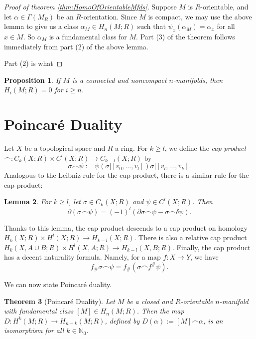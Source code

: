 \documentclass{book}
\newcommand{\bbN}{\mathbb{N}}
\newtheorem{theorem}{Theorem}[section]
\newtheorem{proposition}[theorem]{Proposition}
\newtheorem{lemma}[theorem]{Lemma}
\theoremstyle{definition}
\theoremstyle{remark}
\numberwithin{equation}{section}
\begin{document}
\begin{proof}[Proof of theorem \ref{thm:HomoOfOrientableMfds}]
    Suppose $M$ is $R$-orientable, and let $\alpha \in \Gamma(M_R)$ be an $R$-orientation. Since $M$ is compact, we may use the above lemma to give us a class $\alpha_M \in H_n(M ; R)$ such that $\psi_x(\alpha_M) = \alpha_x$ for all $x \in M$. So $\alpha_M$ is a fundamental class for $M$. Part (3) of the theorem follows immediately from part (2) of the above lemma.

    Part (2) is what
\end{proof}

\begin{proposition}
    If $M$ is a connected and noncompact $n$-manifolds, then $H_i(M;R) = 0$ for $i \geq n$.
\end{proposition}


\section{Poincar\'e Duality}

Let $X$ be a topological space and $R$ a ring. For $k \geq l$, we define the \textit{cap product} $\frown \colon C_k(X;R) \times C^l(X;R) \to C_{k-l}(X;R)$ by
\begin{equation}
    \sigma \frown \psi := \psi(\sigma \vert [v_0,\dots,v_l]) \sigma \vert [v_l,\dots,v_k].
\end{equation}
Analogous to the Leibniz rule for the cup product, there is a similar rule for the cap product:
\begin{lemma}
    For $k \geq l$, let $\sigma \in C_k(X;R)$ and $\psi \in C^l(X;R)$. Then
    \begin{equation}
        \partial(\sigma \frown \psi) = (-1)^l(\partial \sigma \frown \psi - \sigma \frown \delta\psi).
    \end{equation}
\end{lemma}
Thanks to this lemma, the cap product descends to a cap product on homology $H_k(X;R) \times H^l(X;R) \to H_{k-l}(X;R)$. There is also a relative cap product $H_k(X,A \cup B;R) \times H^l(X,A;R) \to H_{k-l}(X,B;R)$. Finally, the cap product has a decent naturality formula. Namely, for a map $f \colon X \to Y$, we have 
\begin{equation}
    f_\# \sigma \frown \psi = f_\# (\sigma \frown f^\# \psi).
\end{equation}

We can now state Poincar\'e duality.
\begin{theorem}[Poincar\'e Duality]
    Let $M$ be a closed and $R$-orientable $n$-manifold with fundamental class $[M] \in H_n(M;R)$. Then the map $D \colon H^k(M;R) \to H_{n-k}(M;R)$, defined by $D(\alpha) := [M] \frown \alpha$, is an isomorphism for all $k \in \bbN_0$.
\end{theorem}
\end{document}
